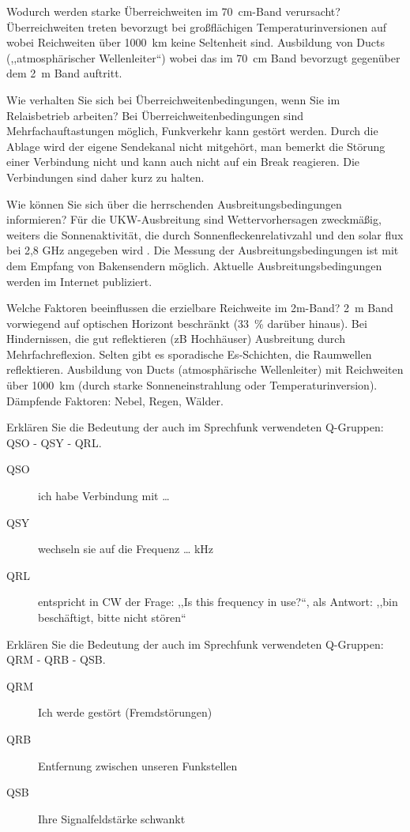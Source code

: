 \documentclass[avery5371,grid,frame,a4paper]{flashcards}
\newcommand{\card}[3]{
  \begin{flashcard}[{\chap} -- #1]{#2}#3\end{flashcard}
}
\begin{document}
\card{23}{Wodurch werden starke Überreichweiten im \SI{70}{\centi\metre}-Band verursacht?}{
  Überreichweiten treten bevorzugt bei großflächigen Temperaturinversionen auf wobei Reichweiten über 1000~km keine Seltenheit sind. Ausbildung von Ducts (,,atmosphärischer Wellenleiter``)  wobei das im \SI{70}{\centi\metre} Band bevorzugt gegenüber dem 2~m Band auftritt.
}
\card{24}{Wie verhalten Sie sich bei Überreichweitenbedingungen, wenn Sie im Relaisbetrieb arbeiten?}{
  Bei Überreichweitenbedingungen sind Mehrfachauftastungen möglich, Funkverkehr kann gestört werden. Durch die Ablage wird der eigene Sendekanal nicht mitgehört, man bemerkt die Störung einer Verbindung nicht und kann auch nicht auf ein Break reagieren. Die Verbindungen sind daher kurz zu halten.
}
\card{25}{Wie können Sie sich über die herrschenden Ausbreitungsbedingungen informieren?}{
  Für die UKW-Ausbreitung sind Wettervorhersagen zweckmäßig, weiters die Sonnenaktivität, die durch Sonnenfleckenrelativzahl und den solar flux bei 2,8 GHz angegeben wird .  Die Messung der Ausbreitungsbedingungen ist mit dem Empfang von Bakensendern möglich. Aktuelle Ausbreitungsbedingungen werden im Internet publiziert.
}
\card{26}{Welche Faktoren beeinflussen die erzielbare Reichweite im 2m-Band?}{
  \SI{2}{\metre} Band vorwiegend auf optischen Horizont beschränkt (\SI{+33}{\percent} darüber hinaus). Bei Hindernissen, die gut reflektieren (zB Hochhäuser) Ausbreitung durch Mehrfachreflexion. Selten gibt es sporadische Es-Schichten, die Raumwellen reflektieren. Ausbildung von Ducts (atmosphärische Wellenleiter) mit Reichweiten über \SI{1000}{\kilo\metre} (durch starke Sonneneinstrahlung oder Temperaturinversion). Dämpfende Faktoren: Nebel, Regen, Wälder. 
}
\card{27}{Erklären Sie die Bedeutung der auch im Sprechfunk verwendeten Q-Gruppen: QSO - QSY - QRL.}{
  \begin{description}
    \item[QSO] ich habe Verbindung mit \dots
    \item[QSY] wechseln sie auf die Frequenz \dots{} kHz
    \item[QRL]
      entspricht in CW der Frage: ,,Is this frequency in use?{}``,
      als Antwort: ,,bin beschäftigt, bitte nicht stören``
  \end{description}
}
\card{28}{Erklären Sie die Bedeutung der auch im Sprechfunk verwendeten Q-Gruppen: QRM - QRB - QSB.}{
  \begin{description}
    \item[QRM] Ich werde gestört (Fremdstörungen)
    \item[QRB] Entfernung zwischen unseren Funkstellen
    \item[QSB] Ihre Signalfeldstärke schwankt
  \end{description}
}
\end{document}
